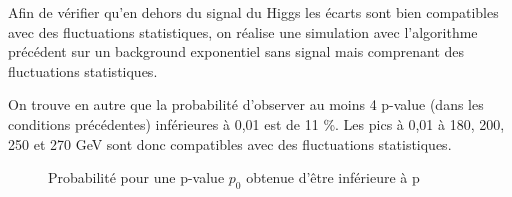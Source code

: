 \documentclass[11pt]{article} %
\begin{document}
Afin de vérifier qu'en dehors du signal du Higgs les écarts sont bien compatibles avec des fluctuations statistiques, on réalise une simulation avec l'algorithme précédent sur un background exponentiel sans signal mais comprenant des fluctuations statistiques.

On trouve en autre que la probabilité d'observer au moins 4 p-value (dans les conditions précédentes) inférieures à 0,01 est de 11 \%. Les pics à 0,01 à 180, 200, 250 et 270 GeV sont donc compatibles avec des fluctuations statistiques.

\begin{figure}[H]
\centering
  \caption{Probabilité pour une p-value $p_0$ obtenue d'être inférieure à p  }
\label{fig:p0_threshold}
 \resizebox{.9\linewidth}{!}{}
\end{figure}




\theendnotes
\end{document}
